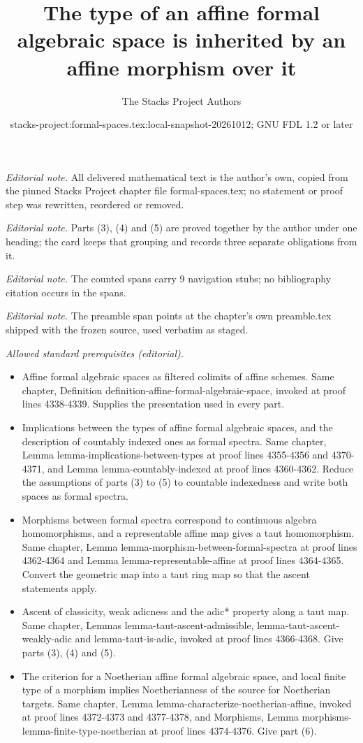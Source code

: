 \documentclass{stacks-project}
\title{The type of an affine formal algebraic space is inherited by an affine morphism over it}
\author{The Stacks Project Authors}
\date{stacks-project:formal-spaces.tex:local-snapshot-20261012; GNU FDL 1.2 or later}
\theoremstyle{plain}
\theoremstyle{definition}
\theoremstyle{remark}
\numberwithin{equation}{subsection}
\begin{document}
\maketitle
\noindent\textit{Editorial note.} All delivered mathematical text is the author's own, copied from the pinned Stacks Project chapter file formal-spaces.tex; no statement or proof step was rewritten, reordered or removed.\par\medskip
\noindent\textit{Editorial note.} Parts (3), (4) and (5) are proved together by the author under one heading; the card keeps that grouping and records three separate obligations from it.\par\medskip
\noindent\textit{Editorial note.} The counted spans carry 9 navigation stubs; no bibliography citation occurs in the spans.\par\medskip
\noindent\textit{Editorial note.} The preamble span points at the chapter's own preamble.tex shipped with the frozen source, used verbatim as staged.\par\medskip
\noindent\textit{Allowed standard prerequisites (editorial).}\begin{itemize}
\item Affine formal algebraic spaces as filtered colimits of affine schemes. Same chapter, Definition definition-affine-formal-algebraic-space, invoked at proof lines 4338-4339. Supplies the presentation used in every part.
\item Implications between the types of affine formal algebraic spaces, and the description of countably indexed ones as formal spectra. Same chapter, Lemma lemma-implications-between-types at proof lines 4355-4356 and 4370-4371, and Lemma lemma-countably-indexed at proof lines 4360-4362. Reduce the assumptions of parts (3) to (5) to countable indexedness and write both spaces as formal spectra.
\item Morphisms between formal spectra correspond to continuous algebra homomorphisms, and a representable affine map gives a taut homomorphism. Same chapter, Lemma lemma-morphism-between-formal-spectra at proof lines 4362-4364 and Lemma lemma-representable-affine at proof lines 4364-4365. Convert the geometric map into a taut ring map so that the ascent statements apply.
\item Ascent of classicity, weak adicness and the adic* property along a taut map. Same chapter, Lemmas lemma-taut-ascent-admissible, lemma-taut-ascent-weakly-adic and lemma-taut-is-adic, invoked at proof lines 4366-4368. Give parts (3), (4) and (5).
\item The criterion for a Noetherian affine formal algebraic space, and local finite type of a morphism implies Noetherianness of the source for Noetherian targets. Same chapter, Lemma lemma-characterize-noetherian-affine, invoked at proof lines 4372-4373 and 4377-4378, and Morphisms, Lemma morphisms-lemma-finite-type-noetherian at proof lines 4374-4376. Give part (6).
\end{itemize}\medskip
\end{document}
